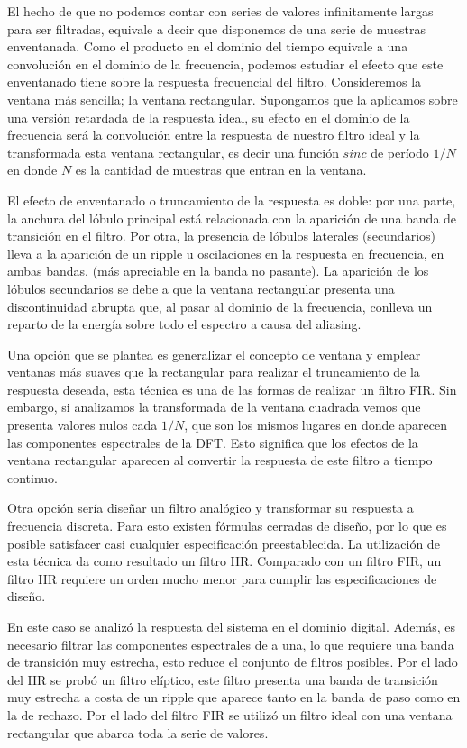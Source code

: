 El hecho de que no podemos contar con series de valores infinitamente largas para ser filtradas, equivale a decir que disponemos de una serie de muestras enventanada.
Como el producto en el dominio del tiempo equivale a una convolución en el dominio de la frecuencia, podemos estudiar el efecto que este enventanado tiene sobre la respuesta frecuencial del filtro.
Consideremos la ventana más sencilla; la ventana rectangular. Supongamos que la aplicamos sobre una versión retardada de la respuesta ideal, su efecto en el dominio de la frecuencia será la convolución entre la respuesta de nuestro filtro ideal y la transformada esta ventana rectangular, es decir una función $sinc$ de período $1/N$ en donde $N$ es la cantidad de muestras que entran en la ventana.

El efecto de enventanado o truncamiento de la respuesta es doble: por una parte, la anchura del lóbulo principal está relacionada con la aparición de una banda de transición en el filtro. Por otra, la presencia de lóbulos laterales (secundarios) lleva a la aparición de un ripple u oscilaciones en la respuesta en frecuencia, en ambas bandas, (más apreciable en la banda no pasante).
La aparición de los lóbulos secundarios se debe a que la ventana rectangular presenta una discontinuidad abrupta que, al pasar al dominio de la frecuencia, conlleva un reparto de la energía sobre todo el espectro a causa del aliasing.

Una opción que se plantea es generalizar el concepto de ventana y emplear ventanas más suaves que la rectangular para realizar el truncamiento de la respuesta deseada, esta técnica es una de las formas de realizar un filtro FIR.
Sin embargo, si analizamos la transformada de la ventana cuadrada vemos que presenta valores nulos cada $1/N$, que son los mismos lugares en donde aparecen las componentes espectrales de la DFT. Esto significa que los efectos de la ventana rectangular aparecen al convertir la respuesta de este filtro a tiempo continuo.

Otra opción sería diseñar un filtro analógico y transformar su respuesta a frecuencia discreta. Para esto existen fórmulas cerradas de diseño, por lo que es posible satisfacer casi cualquier especificación preestablecida. La utilización de esta técnica da como resultado un filtro IIR. Comparado con un filtro FIR, un filtro IIR requiere un orden mucho menor para cumplir las especificaciones de diseño.

En este caso se analizó la respuesta del sistema en el dominio digital.
Además, es necesario filtrar las componentes espectrales de a una, lo que requiere una banda de transición muy estrecha, esto reduce el conjunto de filtros posibles.
Por el lado del IIR se probó un filtro elíptico, este filtro presenta una banda de transición muy estrecha a costa de un ripple que aparece tanto en la banda de paso como en la de rechazo.
Por el lado del filtro FIR se utilizó un filtro ideal con una ventana rectangular que abarca toda la serie de valores.


